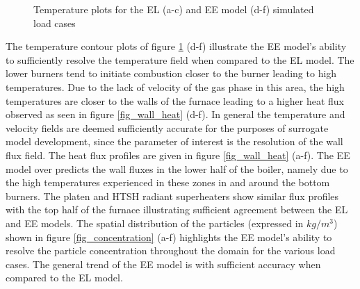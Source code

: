 \documentclass{webofc}
\begin{document}
\begin{figure}[h!]
\setlength{\belowcaptionskip}{0pt}
\caption{Temperature plots for the EL (a-c) and EE model (d-f) simulated load cases}
\label{fig_temp}
\end{figure}

The temperature contour plots of figure \ref{fig_temp} (d-f) illustrate the EE model's ability to sufficiently resolve the temperature field when compared to the EL model. The lower burners tend to initiate combustion closer to the burner leading to high temperatures. Due to the lack of velocity of the gas phase in this area, the high temperatures  are closer to the walls of the furnace leading to a higher heat flux observed as seen in figure \ref{fig_wall_heat} (d-f). In general the temperature and velocity fields are deemed sufficiently accurate for the purposes of surrogate model development, since the parameter of interest is the resolution of the wall flux field. The heat flux profiles are given in figure \ref{fig_wall_heat} (a-f). The EE model over predicts the wall fluxes in the lower half of the boiler, namely due to the high temperatures experienced in these zones in and around the bottom burners. The platen and HTSH radiant superheaters show similar flux profiles with the top half of the furnace illustrating sufficient agreement between the EL and EE models. The spatial distribution of the particles (expressed in $kg/m^3$) shown in figure \ref{fig_concentration} (a-f) highlights the EE model's ability to resolve the particle concentration throughout the domain for the various load cases. The general trend of the EE model is with sufficient accuracy when compared to the EL model.\\
\end{document}
